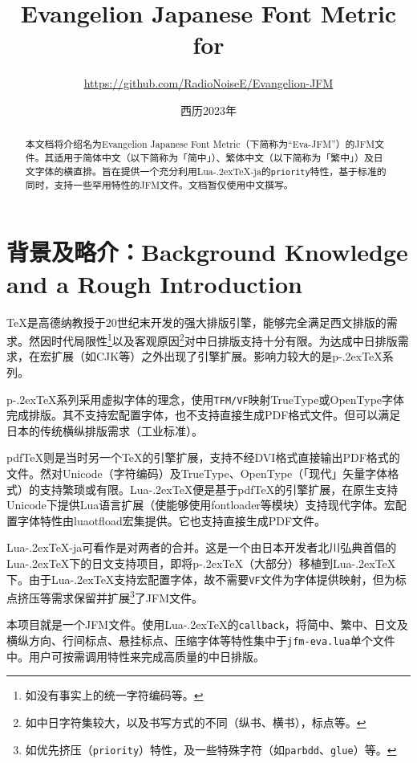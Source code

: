 \documentclass{ltjsarticle}
\title{\sffamily\bfseries Evangelion Japanese Font Metric for \LuaTeX}
\author{\large \url{https://github.com/RadioNoiseE/Evangelion-JFM}}
\date{西历2023年}
\def\段{\par}
\def\LuaTeX{Lua\kern-.2ex\TeX}
\def\pTeX{p\kern-.2ex\TeX}
\def\pdfTeX{pdf\TeX}
\begin{document}
\zw\parskip=2pt

\maketitle

\begin{abstract}
    本文档将介绍名为Evangelion Japanese Font Metric（下简称为``\textsf{Eva-JFM}''）的JFM文件。其适用于简体中文（以下简称为「简中」）、繁体中文（以下简称为「繁中」）及日文字体的横直排。旨在提供一个充分利用\LuaTeX{}-ja的\texttt{priority}特性，基于标准\cite{jlreq}的同时，支持一些罕用特性的JFM文件。文档暂仅使用中文撰写。\段
\end{abstract}

\section{背景及略介：Background Knowledge and a Rough Introduction}
\TeX{}是高德纳教授于20世纪末开发的强大排版引擎，能够完全满足西文排版的需求。然因时代局限性\footnote{如没有事实上的统一字符编码等。}以及客观原因\footnote{如中日字符集较大，以及书写方式的不同（纵书、横书），标点等。}对中日排版支持十分有限。为达成中日排版需求，在宏扩展（如\textsf{CJK}等）之外出现了引擎扩展。影响力较大的是\pTeX{}系列。\段
\pTeX{}系列采用虚拟字体的理念，使用\texttt{TFM/VF}映射TrueType或OpenType字体完成排版。其不支持宏配置字体，也不支持直接生成PDF格式文件。但可以满足日本的传统横纵排版需求（工业标准）。\段
\pdfTeX{}则是当时另一个\TeX{}的引擎扩展，支持不经DVI格式直接输出PDF格式的文件。然对Unicode（字符编码）及TrueType、OpenType（「现代」矢量字体格式）的支持繁琐或有限。\LuaTeX{}便是基于\pdfTeX{}的引擎扩展，在原生支持Unicode下提供Lua语言扩展（使能够使用\textsf{fontloader}等模块）支持现代字体。宏配置字体特性由\textsf{luaotfload}宏集提供。它也支持直接生成PDF文件。\段
\LuaTeX{}-ja可看作是对两者的合并。这是一个由日本开发者北川弘典首倡的\LuaTeX{}下的日文支持项目，即将\pTeX{}（大部分）移植到\LuaTeX{}下。由于\LuaTeX{}支持宏配置字体，故不需要\texttt{VF}文件为字体提供映射，但为标点挤压等需求保留并扩展\footnote{如优先挤压（\texttt{priority}）特性，及一些特殊字符（如\texttt{parbdd}、\texttt{glue}）等。}了JFM文件。\段
本项目就是一个JFM文件。使用\LuaTeX{}的\texttt{callback}，将简中、繁中、日文及横纵方向、行间标点、悬挂标点、压缩字体等特性集中于\texttt{jfm-eva.lua}单个文件中。用户可按需调用特性来完成高质量的中日排版。
\end{document}
